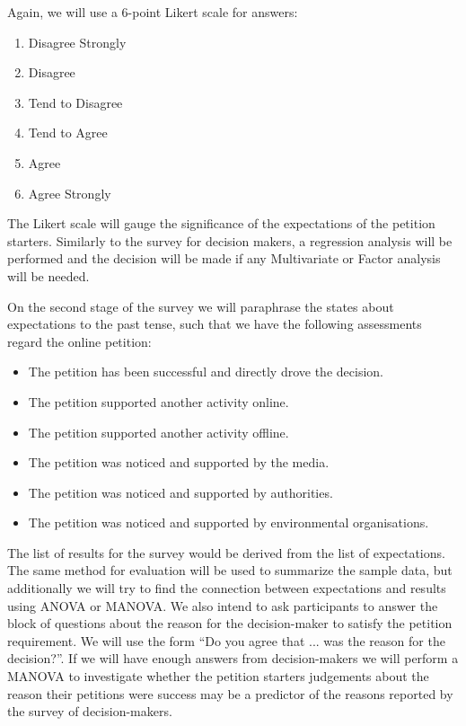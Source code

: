 Again, we will use a 6-point Likert scale for answers:

\begin{enumerate}[start=0]
\item Disagree Strongly
\item Disagree
\item Tend to Disagree
\item Tend to Agree
\item Agree
\item Agree Strongly
\end{enumerate}

The Likert scale will gauge the significance of the expectations of the petition starters. Similarly to the survey for decision makers, a regression analysis will be performed and the decision will be made if any Multivariate or Factor analysis will be needed.\par\vspace{0.2cm}

On the second stage of the survey we will paraphrase the states about expectations to the past tense, such that we have the following assessments regard the online petition:

\begin{itemize}
\item The petition has been successful and directly drove the decision.
\item The petition supported another activity online.
\item The petition supported another activity offline.
\item The petition was noticed and supported by the media.
\item The petition was noticed and supported by authorities.
\item The petition was noticed and supported by environmental organisations.
\end{itemize}

The list of results for the survey would be derived from the list of expectations. The same method for evaluation will be used to summarize the sample data, but additionally we will try to find the connection between expectations and results using ANOVA or MANOVA. We also intend to ask participants to answer the block of questions about the reason for the decision-maker to satisfy the petition requirement. We will use the form ``Do you agree that ... was the reason for the decision?''. If we will have enough answers from decision-makers we will perform a MANOVA to investigate whether the petition starters judgements about the reason their petitions were success may be a predictor of the reasons reported by the survey of decision-makers.

